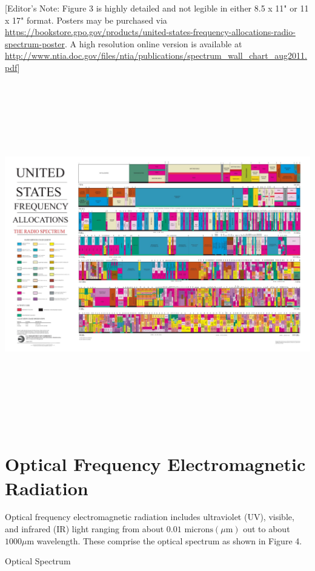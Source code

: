 \documentclass[
]{book}
\begin{document}
{[}Editor's Note: Figure 3 is highly detailed and not legible in either 8.5 x 11"
or 11 x 17" format. Posters may be purchased via
\url{https://bookstore.gpo.gov/products/united-states-frequency-allocations-radio-spectrum-poster}.
A high resolution online version is available at
\url{http://www.ntia.doc.gov/files/ntia/publications/spectrum_wall_chart_aug2011.pdf}{]}

\includegraphics[width=9.25068in,height=5.90597in]{media/19/image3.jpeg}

\hypertarget{optical-frequency-electromagnetic-radiation}{%
\section{Optical Frequency Electromagnetic Radiation}\label{optical-frequency-electromagnetic-radiation}}

Optical frequency electromagnetic radiation includes ultraviolet (UV), visible,
and infrared (IR) light ranging from about
\(0.01 \text{ microns} \left(\mu\text{m}\right)\) out to about
\(1000 \mu\text{m}\) wavelength. These comprise the optical spectrum as shown in
Figure 4.

Optical Spectrum
\end{document}
